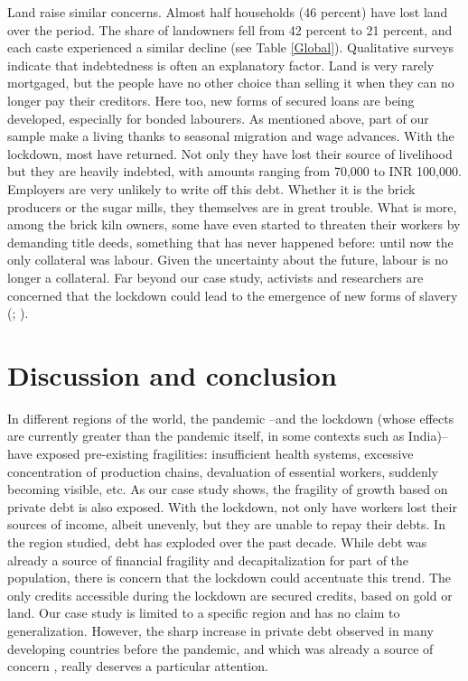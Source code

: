 \documentclass[a4paper, 11pt, onecolumn]{article}
\begin{document}
Land raise similar concerns. 
Almost half households (46 percent) have lost land over the period. 
The share of landowners fell from 42 percent to 21 percent, and each caste experienced a similar decline (see Table \ref{Global}). 
Qualitative surveys indicate that indebtedness is often an explanatory factor. 
Land is very rarely mortgaged, but the people have no other choice than selling it when they can no longer pay their creditors. 
Here too, new forms of secured loans are being developed, especially for bonded labourers. 
As mentioned above, part of our sample make a living thanks to seasonal migration and wage advances. 
With the lockdown, most have returned. 
Not only they have lost their source of livelihood but they are heavily indebted, with amounts ranging from 70,000 to INR 100,000. 
Employers are very unlikely to write off this debt. 
Whether it is the brick producers or the sugar mills, they themselves are in great trouble. What is more, among the brick kiln owners, some have even started to threaten their workers by demanding title deeds, something that has never happened before: until now the only collateral was labour. 
Given the uncertainty about the future, labour is no longer a collateral. 
Far beyond our case study, activists and researchers are concerned that the lockdown could lead to the emergence of new forms of slavery (\citealp{Nagaraj2020}; \citealp[p.14]{Sahas2020}).   










\section*{Discussion and conclusion}
\label{section:conclusion}
In different regions of the world, the pandemic --and the lockdown (whose effects are currently greater than the pandemic itself, in some contexts such as India)-- have exposed pre-existing fragilities: insufficient health systems, excessive concentration of production chains, devaluation of essential workers, suddenly becoming visible, etc. 
As our case study shows, the fragility of growth based on private debt is also exposed. 
With the lockdown, not only have workers lost their sources of income, albeit unevenly, but they are unable to repay their debts. 
In the region studied, debt has exploded over the past decade. 
While debt was already a source of financial fragility and decapitalization for part of the population, there is concern that the lockdown could accentuate this trend. 
The only credits accessible during the lockdown are secured credits, based on gold or land.
Our case study is limited to a specific region and has no claim to generalization. 
However, the sharp increase in private debt observed in many developing countries before the pandemic, and which was already a source of concern \citep{WorldBank2020, UNCTAD2019, UN2020}, really deserves a particular attention.
\end{document}
